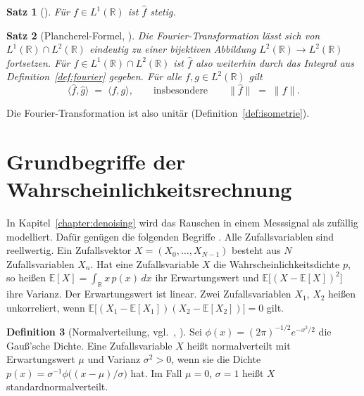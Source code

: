 \documentclass[a4paper,11pt,bibliography=totoc,listof=totoc,headinclude=true,cleardoublepage=empty,oneside]{scrbook}
\theoremstyle{plain}
\newtheorem{Satz}{Satz}[chapter]
\theoremstyle{definition}
\newtheorem{Definition}[Satz]{Definition}
\newcommand{\R}{\mathbb{R}}
\newcommand{\LZwei}{L^2(\R)}
\newcommand{\scal}[2]{\langle #1, #2 \rangle}
\newcommand{\norm}[1]{\lVert #1 \rVert}
\begin{document}
\begin{Satz}[{\cite[Satz~(2.9)]{blatter}}] %
\label{satz:riemann-lebesgue}
Für $f\in L^1(\R)$ ist $\hat f$ stetig.
\end{Satz}

\begin{Satz}[Plancherel-Formel, {\cite[Satz~(2.11)]{blatter}}] %
\label{satz:plancherel-ft}
Die Fourier-Transformation lässt sich von $L^1(\R) \cap \LZwei$ eindeutig zu
einer bijektiven Abbildung $\LZwei \to \LZwei$ fortsetzen. Für
$f\in L^1(\R)\cap\LZwei$ ist $\hat f$ also weiterhin durch das Integral aus
Definition~\ref{def:fourier} gegeben. Für alle $f, g \in \LZwei$ gilt
\begin{equation}
\label{eq:plancherel-ft}
  \scal{\hat f}{\hat g} \;=\; \scal{f}{g},
  \qquad\text{insbesondere}\qquad
  \norm{\hat f} \;=\; \norm{f} .
\end{equation}
\end{Satz}

Die Fourier-Transformation ist also unitär (Definition~\ref{def:isometrie}).

\section{Grundbegriffe der Wahrscheinlichkeitsrechnung}
\label{sec:wahrscheinlichkeit}

In Kapitel~\ref{chapter:denoising} wird das Rauschen in einem Messsignal als
zufällig modelliert. Dafür genügen die folgenden Begriffe
\cite[Anhang~A.6]{mallat}. %
Alle Zufallsvariablen sind reellwertig. Ein Zufallsvektor
$X = (X_0,\dots,X_{N-1})$ besteht aus $N$ Zufallsvariablen $X_n$. Hat eine
Zufallsvariable $X$ die Wahrscheinlichkeitsdichte $p$, so hei\ss en
$\mathbb E[X] = \int_\R x\,p(x)\,dx$ ihr Erwartungswert und
$\mathbb E\bigl[(X - \mathbb E[X])^2\bigr]$ ihre Varianz. Der Erwartungswert
ist linear. Zwei Zufallsvariablen $X_1$, $X_2$ hei\ss en unkorreliert, wenn
$\mathbb E\bigl[(X_1-\mathbb E[X_1])(X_2-\mathbb E[X_2])\bigr] = 0$ gilt.

\begin{Definition}[Normalverteilung, vgl.\ {\cite[Kap.~1.4, Satz~(3.6)]{blatter}}, {\cite[Kap.~11.2.2]{mallat}}] %
\label{def:normalverteilung}
Sei $\phi(x) = (2\pi)^{-1/2}e^{-x^2/2}$ die Gau\ss'sche Dichte. Eine
Zufallsvariable $X$ hei\ss t normalverteilt mit Erwartungswert $\mu$ und Varianz
$\sigma^2>0$, wenn sie die Dichte
$p(x) = \sigma^{-1}\phi\bigl((x-\mu)/\sigma\bigr)$ hat. Im Fall $\mu = 0$,
$\sigma = 1$ hei\ss t $X$ standardnormalverteilt.
\end{Definition}
\end{document}
